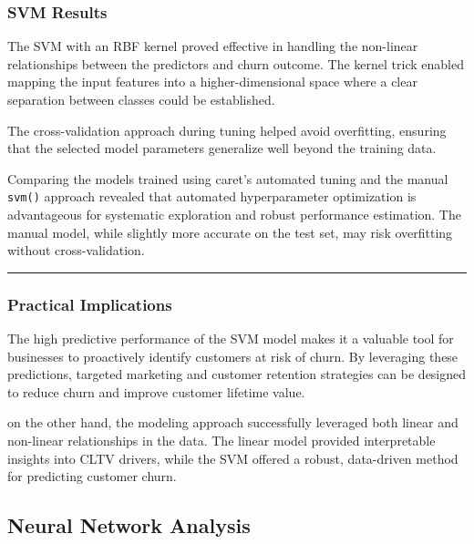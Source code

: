 \documentclass[
]{article}
\begin{document}
\hypertarget{svm-results}{%
\subsubsection{SVM Results}\label{svm-results}}

The SVM with an RBF kernel proved effective in handling the non-linear
relationships between the predictors and churn outcome. The kernel trick
enabled mapping the input features into a higher-dimensional space where
a clear separation between classes could be established.

The cross-validation approach during tuning helped avoid overfitting,
ensuring that the selected model parameters generalize well beyond the
training data.

Comparing the models trained using caret's automated tuning and the
manual \texttt{svm()} approach revealed that automated hyperparameter
optimization is advantageous for systematic exploration and robust
performance estimation. The manual model, while slightly more accurate
on the test set, may risk overfitting without cross-validation.

\begin{center}\rule{0.5\linewidth}{0.5pt}\end{center}

\hypertarget{practical-implications}{%
\subsubsection{Practical Implications}\label{practical-implications}}

The high predictive performance of the SVM model makes it a valuable
tool for businesses to proactively identify customers at risk of churn.
By leveraging these predictions, targeted marketing and customer
retention strategies can be designed to reduce churn and improve
customer lifetime value.

on the other hand, the modeling approach successfully leveraged both
linear and non-linear relationships in the data. The linear model
provided interpretable insights into CLTV drivers, while the SVM offered
a robust, data-driven method for predicting customer churn.

\hypertarget{neural-network-analysis}{%
\subsection{Neural Network Analysis}\label{neural-network-analysis}}
\end{document}
